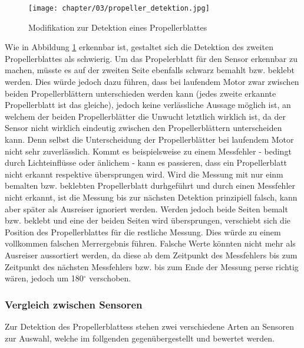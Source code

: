 \begin{figure}[h]
	\centering
	\texttt{[image: chapter/03/propeller\_detektion.jpg]}
	\caption{Modifikation zur Detektion eines Propellerblattes}
	\label{fig:propeller_detektion}
\end{figure}
Wie in Abbildung \ref{fig:propeller_detektion} erkennbar ist, gestaltet sich die Detektion des zweiten Propellerblattes als schwierig. 
Um das Propelerblatt für den Sensor erkennbar zu machen, müsste es auf der zweiten Seite ebenfalls schwarz bemahlt bzw. beklebt werden.
Dies würde jedoch dazu führen, dass bei laufendem Motor zwar zwischen beiden Propellerblättern unterschieden werden kann (jedes zweite erkannte Propellerblatt ist das gleiche), jedoch keine verlässliche Aussage möglich ist, an welchem der beiden Propellerblätter die Unwucht letztlich wirklich ist, da der Sensor nicht wirklich eindeutig zwischen den Propellerblättern unterscheiden kann.
Denn selbst die Unterscheidung der Propellerblätter bei laufendem Motor nicht sehr zuverlässlich.
Kommt es beispielsweise zu einem Messfehler - bedingt durch Lichteinflüsse oder änlichem - kann es passieren, dass ein Propellerblatt nicht erkannt respektive übersprungen wird.
Wird die Messung mit nur einm bemalten bzw. beklebten Propellerblatt durhgeführt und durch einen Messfehler nicht erkannt, ist die Messung bis zur nächsten Detektion prinzipiell falsch, kann aber später als Ausreiser ignoriert werden.
Werden jedoch beide Seiten bemalt bzw. beklebt und eine der beiden Seiten wird übersprungen, verschiebt sich die Position des Propellerblattes für die restliche Messung.
Dies würde zu einem vollkommen falschen Merrergebnis führen.
Falsche Werte könnten nicht mehr als Ausreiser aussortiert werden, da diese ab dem Zeitpunkt des Messfehlers bis zum Zeitpunkt des nächsten Messfehlers bzw. bis zum Ende der Messung perse richtig wären, jedoch um 180$^\circ$ verschoben.

\subsubsection*{Vergleich zwischen Sensoren}
Zur Detektion des Propellerblattess stehen zwei verschiedene Arten an Sensoren zur Auswahl, welche im follgenden gegenübergestellt und bewertet werden.

